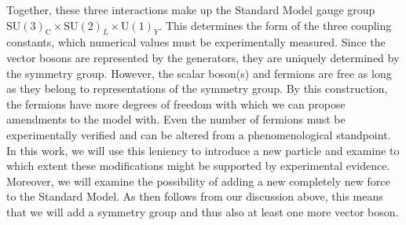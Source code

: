 Together, these three interactions make up the Standard Model gauge group $\mathrm{SU}(3)_{\mathrm{C}} \times \mathrm{SU}(2)_{L} \times \mathrm{U}(1)_{Y}$. 
This determines the form of the three coupling constants, which numerical values must be experimentally measured. 
Since the vector bosons are represented by the generators, they are uniquely determined by the symmetry group. However, the scalar boson(s) and fermions are free as long as they
belong to representations of the symmetry group. By this construction, the fermions have more degrees of freedom with which we can propose amendments to the model with. Even the
number of fermions must be experimentally verified and can be altered from a phenomenological standpoint. In this work,
we will use this leniency to introduce a new particle and examine to which extent 
these modifications might be supported by experimental evidence. Moreover, we will examine the possibility of adding a new completely new force to the Standard Model.
As then follows from our discussion above, this means that we will add a symmetry group and thus also at least one more vector boson. 

